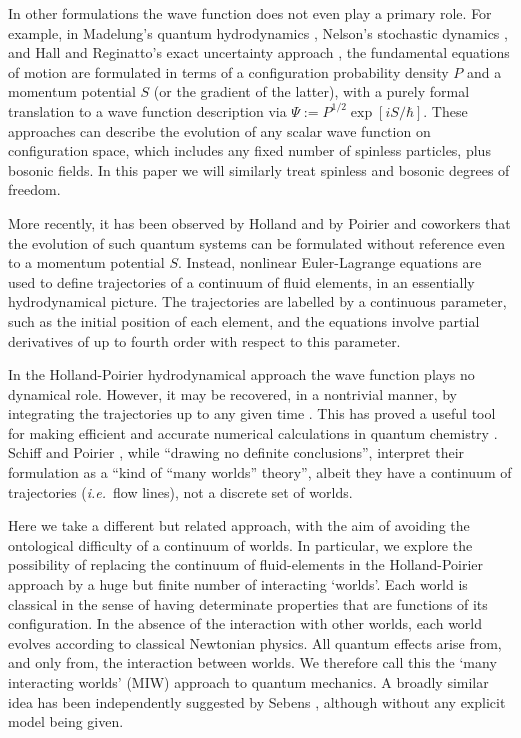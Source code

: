 \documentclass[twocolumn,aps,pra,amsmath,amssymb,superscriptaddress]{revtex4}
\newcommand{\ie}{{\em i.e.}}
\renewcommand{\(}{\left(}
\renewcommand{\)}{\right)}
\newcommand{\blk}{\color{black}}
\newcommand{\blu}{\color{blue}}
\renewcommand\blu{\blk}
\begin{document}
In other formulations the wave function does not even play a primary role.  For
example, in Madelung's quantum hydrodynamics \cite{madelung}, Nelson's
stochastic dynamics \cite{nelson}, and Hall and Reginatto's exact uncertainty
approach \cite{exact}, the fundamental equations of motion are formulated in
terms of a configuration probability density $P$ and a momentum potential $S$
(or the gradient of the latter), with a purely formal translation to a
wave function description via $\Psi:=P^{1/2}\exp[iS/\hbar]$. \blk These
approaches can describe the evolution of any scalar wave function on
configuration space, which includes any fixed number of spinless particles, plus
bosonic fields.   In this paper we will similarly
treat spinless and bosonic degrees of freedom. \blk 

More recently, it has  been observed by Holland \cite{holland} and by Poirier and
coworkers \cite{poirier, parlant,schiff} that \blk the evolution of  such \blk
quantum systems 
can be formulated without reference
even to a momentum potential $S$.  Instead, nonlinear Euler-Lagrange equations
are used to define trajectories of a continuum of fluid elements, in an
essentially hydrodynamical picture.  The trajectories are labelled by a
continuous parameter, such as the initial position of each element, and the
equations involve partial derivatives of up to fourth order with respect to this
parameter. 

In the Holland-Poirier \blk hydrodynamical \blk approach the wave function plays
no dynamical role.  However, it may be recovered, in a nontrivial manner, by
integrating the trajectories up to any given time \cite{holland}.  This has
proved a useful tool for making efficient and accurate numerical calculations in
quantum chemistry \cite{poirier,parlant}.  \blk Schiff and Poirier
\cite{schiff}, while ``drawing no definite conclusions'', interpret their
formulation as a ``kind of ``many worlds'' theory'', albeit they have a
continuum of trajectories (\ie~flow lines), not a discrete set of worlds. \blk 

Here we take a different \blk but related \blk approach, with the aim of
avoiding the ontological difficulty of a continuum of worlds.  In particular, we
explore the possibility of replacing the continuum of fluid-elements
in the Holland-Poirier approach by a \blk huge \blk but
finite number of interacting \blk `worlds'.  Each world is classical in the
sense  \blu of having \blk determinate properties \blu that \blk are functions of its
configuration.
In the absence of the interaction with
other worlds, each world evolves according to classical Newtonian physics.  All
quantum effects arise from, and only from, the interaction between worlds. We
therefore call this the `many interacting worlds' (MIW) approach to quantum
mechanics.  A broadly similar idea has been independently suggested by Sebens
\cite{sebens}, although without any explicit model being given.
\end{document}
